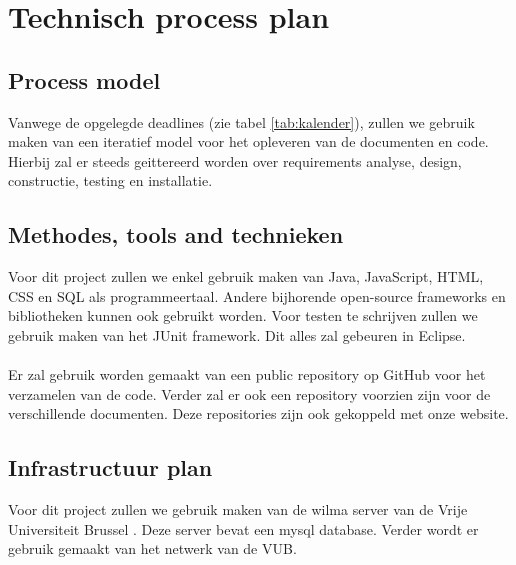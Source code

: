 \chapter{Technisch process plan}
\section{Process model}
Vanwege de opgelegde deadlines (zie tabel \ref{tab:kalender}), zullen we gebruik maken van een iteratief model voor het opleveren van de documenten en code. Hierbij zal er steeds geittereerd worden over requirements analyse, design, constructie, testing en installatie.
\section{Methodes, tools and technieken} \label{sec:languages}
Voor dit project zullen we enkel gebruik maken van Java, JavaScript, HTML, CSS en SQL als programmeertaal. Andere bijhorende open-source frameworks en bibliotheken kunnen ook gebruikt worden. Voor testen te schrijven zullen we gebruik maken van het JUnit framework. Dit alles zal gebeuren in Eclipse. 
\\
\\
Er zal gebruik worden gemaakt van een public repository op GitHub \cite{GitHubRepository} voor het verzamelen van de code. Verder zal er ook een repository voorzien zijn voor de verschillende documenten. Deze repositories zijn ook gekoppeld met onze website.

\section{Infrastructuur plan}
Voor dit project zullen we gebruik maken van de wilma server van de Vrije Universiteit Brussel \cite{WilmaServer}. Deze server bevat een mysql database. Verder wordt er gebruik gemaakt van het netwerk van de VUB.

